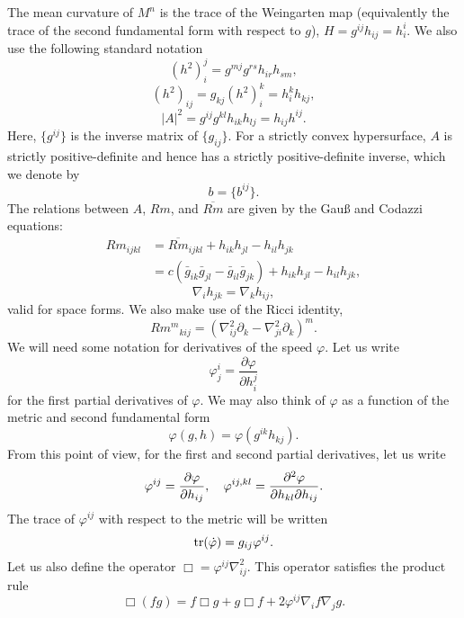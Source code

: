 \documentclass{amsart}
\begin{document}
The mean curvature of $M^n$ is the trace of the Weingarten map (equivalently the trace of the second fundamental form with respect to $g$), $H = g^{ij}h_{ij} = h^i_i$. We also use the following standard notation
\[
(h^2)_i^j = g^{mj}g^{rs}h_{ir}h_{sm},
\]
\[
(h^2)_{ij} = g_{kj} (h^2)_i^k = h^k_i h_{kj},
\]
\[
|A|^2 = g^{ij}g^{kl}h_{ik}h_{lj} = h_{ij}h^{ij}.
\]
Here, $\{g^{ij}\}$ is the inverse matrix of $\{g_{ij}\}.$ For a strictly convex hypersurface, \(A\) is strictly positive-definite and hence has a strictly positive-definite inverse, which we denote by
\[
b = \{b^{ij}\}.
\]
The relations between $A$, $Rm$, and $\overline{Rm}$ are given by the Gau{\ss} and Codazzi equations:
\[
\begin{split}
Rm_{ijkl} &= \overline{Rm}_{ijkl} + h_{ik}h_{jl} - h_{il}h_{jk} \\
&= c(\bar{g}_{ik}\bar{g}_{jl} - \bar{g}_{il}\bar{g}_{jk}) + h_{ik}h_{jl} - h_{il}h_{jk},
\end{split}
\]
\[
\nabla_i h_{jk} = \nabla_k h_{ij},
\]
valid for space forms. We also make use of the Ricci identity,
\[
{Rm^m}_{kij}  = \left(\nabla^2_{ij} \partial_k - \nabla^2_{ji} \partial_k\right)^m.
\]
We will need some notation for derivatives of the speed \(\varphi\). Let us write
\[
\varphi^{i}_{j} = \frac{\partial \varphi}{\partial h^{j}_{i}}
\]
for the first partial derivatives of \(\varphi\). We may also think of \(\varphi\) as a function of the metric and second fundamental form
\[
\varphi(g, h) = \varphi(g^{ik} h_{kj}).
\]
From this point of view, for the first and second partial derivatives, let us write
\[
\varphi^{ij} = \frac{\partial\varphi}{\partial h_{ij}}, \quad \varphi^{ij,kl} = \frac{\partial^2\varphi}{\partial h_{kl} \partial h_{ij}}.
\]
The trace of \(\varphi^{ij}\) with respect to the metric will be written
\[
\operatorname{tr}(\dot{\varphi}) = g_{ij} \varphi^{ij}.
\]
Let us also define the operator
$
\Box = \varphi^{ij} \nabla^2_{ij}.
$
This operator satisfies the product rule
\begin{equation}
\label{eq:productbox}
\Box (fg) = f \Box g + g \Box f + 2 \varphi^{ij} \nabla_i f \nabla_j g.
\end{equation}
\end{document}
